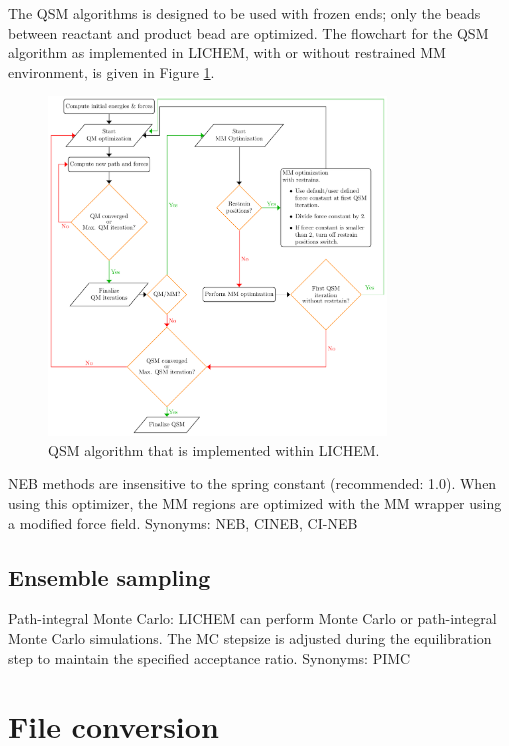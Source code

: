 \documentclass[12pt]{report}
\begin{document}
The QSM algorithms is designed to be used with frozen ends; 
only the beads between reactant and product bead are optimized. The flowchart
for the QSM algorithm as implemented in LICHEM, with or without
restrained MM environment, is given in Figure \ref{fig:qsm}.

\begin{center}
\begin{figure}[ht!]
\centering
\includegraphics[width=0.8\textwidth]{manual/qsm_flowchart.pdf}
\caption{QSM algorithm that is implemented within LICHEM.}
\label{fig:qsm}
\end{figure}
\end{center} 
NEB methods are insensitive to the spring constant (recommended: 1.0).
When using this optimizer, the MM regions are optimized with the MM wrapper
using a modified force field. 
Synonyms: NEB, CINEB, CI-NEB \\

\subsection{Ensemble sampling}

Path-integral Monte Carlo: LICHEM can perform Monte Carlo or path-integral
Monte Carlo simulations.
The MC stepsize is adjusted during the equilibration step to maintain the
specified acceptance ratio.
Synonyms: PIMC \\

\section{File conversion}
\end{document}
